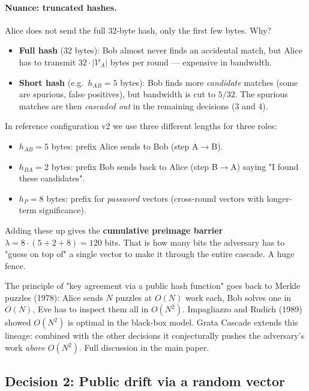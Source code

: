 \documentclass[11pt,a4paper]{article}
\begin{document}
\paragraph{Nuance: truncated hashes.} Alice does not send the full 32-byte hash, only the first few bytes. Why?

\begin{itemize}[leftmargin=*]
\item \textbf{Full hash} (32 bytes): Bob almost never finds an accidental match, but Alice has to transmit $32 \cdot |\mathcal{V}_A|$ bytes per round --- expensive in bandwidth.
\item \textbf{Short hash} (e.g.\ $h_{AB} = 5$ bytes): Bob finds more \emph{candidate} matches (some are spurious, false positives), but bandwidth is cut to $5/32$. The spurious matches are then \emph{cascaded out} in the remaining decisions (3 and 4).
\end{itemize}

In reference configuration v2 we use three different lengths for three roles:
\begin{itemize}[leftmargin=*]
\item $h_{AB} = 5$ bytes: prefix Alice sends to Bob (step A$\to$B).
\item $h_{BA} = 2$ bytes: prefix Bob sends back to Alice (step B$\to$A) saying "I found these candidates".
\item $h_P = 8$ bytes: prefix for \emph{password} vectors (cross-round vectors with longer-term significance).
\end{itemize}

Adding these up gives the \textbf{cumulative preimage barrier} $\lambda = 8 \cdot (5 + 2 + 8) = 120$ bits. That is how many bits the adversary has to "guess on top of" a single vector to make it through the entire cascade. A huge fence.

\begin{sidebar}
The principle of "key agreement via a public hash function" goes back to Merkle puzzles (1978): Alice sends $N$ puzzles at $O(N)$ work each, Bob solves one in $O(N)$, Eve has to inspect them all in $O(N^2)$. Impagliazzo and Rudich (1989) showed $O(N^2)$ is optimal in the black-box model. Grata Cascade extends this lineage: combined with the other decisions it conjecturally pushes the adversary's work \emph{above} $O(N^2)$. Full discussion in the main paper.
\end{sidebar}

\subsection{Decision 2: Public drift via a random vector}\label{pop:design-drift}
\end{document}
